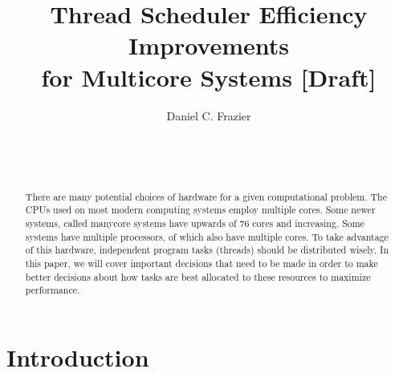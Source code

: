 \documentclass{sig-alternate}
\begin{document}

\title{Thread Scheduler Efficiency Improvements \\ for Multicore Systems [Draft]}


\author{
\alignauthor
Daniel C. Frazier\\
	\\
	\\
	\\
}
\maketitle


\begin{abstract}
There are many potential choices of hardware for a given computational problem. The CPUs used on most modern computing systems employ multiple cores. Some newer systems, called manycore systems have upwards of 76 cores and increasing. Some systems have multiple processors, of which also have multiple cores. To take advantage of this hardware, independent program tasks (threads) should be distributed wisely. In this paper, we will cover important decisions that need to be made in order to make better decisions about how tasks are best allocated to these resources to maximize performance.

\end{abstract}


\section{Introduction}
\label{sec:intro}
\end{document}
